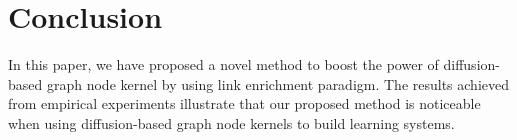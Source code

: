 \documentclass{article}
\begin{document}
\section{Conclusion}
\label{conclusion}
In this paper, we have proposed a novel method to boost the power of diffusion-based graph node kernel by using link enrichment paradigm. The results achieved from empirical experiments illustrate that our proposed method is noticeable when using diffusion-based graph node kernels to build learning systems.




\end{document}
